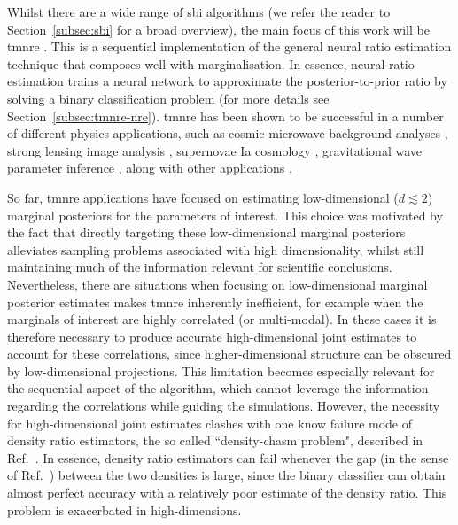 Whilst there are a wide range of \gls*{sbi} algorithms (we refer the reader to Section~\ref{subsec:sbi} for a broad overview), the main focus of this work will be \gls*{tmnre} \cite{Miller:2020hua, Miller:2021aa}. This is a sequential implementation of the general neural ratio estimation technique \cite{Hermans:2019ioj} that composes well with marginalisation. In essence, neural ratio estimation trains a neural network to approximate the posterior-to-prior ratio by solving a binary classification problem (for more details see Section~\ref{subsec:tmnre-nre}).
\Gls*{tmnre} has been shown to be successful in a number of different physics applications, such as cosmic microwave background analyses \cite{Cole:2021gwr}, strong lensing image analysis \cite{Montel:2022fhv, Coogan:2022cky}, supernovae Ia cosmology \cite{Karchev:2022xyn}, gravitational wave parameter inference \cite{Bhardwaj:2023xph, Alvey:2023naa}, along with other applications \cite{Gagnon-Hartman:2023soa, Saxena:2023tue, AnauMontel:2022ppb, Alvey:2023pkx}.

So far, \gls*{tmnre} applications have focused on estimating low-dimensional ($d \lesssim 2$) marginal posteriors for the parameters of interest. This choice was motivated by the fact that directly targeting these low-dimensional marginal posteriors alleviates sampling problems associated with high dimensionality, whilst still maintaining much of the information relevant for scientific conclusions. 
Nevertheless, there are situations when focusing on low-dimensional marginal posterior estimates makes \gls*{tmnre} inherently inefficient, for example when the marginals of interest are highly correlated (or multi-modal). In these cases it is therefore necessary to produce accurate high-dimensional joint estimates to account for these correlations, since higher-dimensional structure can be obscured by low-dimensional projections. This limitation becomes especially relevant for the sequential aspect of the algorithm, which cannot leverage the information regarding the correlations while guiding the simulations. However, the necessity for high-dimensional joint estimates clashes with one know failure mode of density ratio estimators, the so called ``density-chasm problem", described in Ref.~\cite{Rhodes:2020aa}. In essence, density ratio estimators can fail whenever the gap (in the sense of Ref.~\cite{Rhodes:2020aa}) between the two densities is large, since the binary classifier can obtain almost perfect accuracy with a relatively poor estimate of the density ratio. This problem is exacerbated in high-dimensions. 

